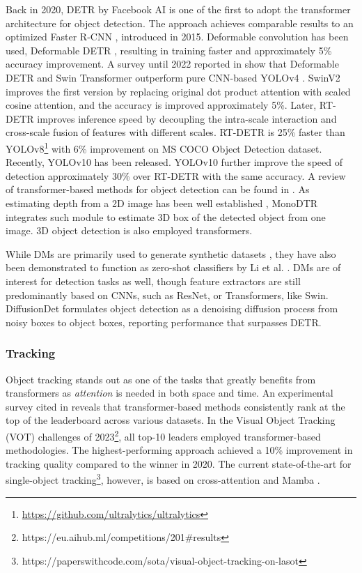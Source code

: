 \documentclass[11pt,a4paper]{article}
\begin{document}
Back in 2020, DETR by Facebook AI \cite{Carion:DERT:2020} is one of the first to adopt the transformer architecture for object detection. The approach achieves comparable results to an optimized Faster R-CNN \cite{Ren:Faster:2027}, introduced in 2015. Deformable convolution has been used, Deformable DETR \cite {Zhu:Deformable:2021}, resulting in training faster and approximately 5\% accuracy improvement.
A survey until 2022 reported in \cite{Zou:object:2023} show that Deformable DETR and Swin Transformer \cite{Liu:Swin:2021} outperform pure CNN-based YOLOv4 \cite{bochkovskiy2020yolov4}. 
SwinV2 improves the first version by replacing original dot product attention with scaled cosine attention, and the accuracy is improved approximately 5\%. Later, RT-DETR \cite{lv2:detrs:2024} improves inference speed by decoupling the intra-scale interaction and cross-scale fusion of features with different scales. RT-DETR is 25\% faster than YOLOv8\footnote{\url{https://github.com/ultralytics/ultralytics}} with 6\% improvement on MS COCO Object Detection dataset. Recently, YOLOv10 \cite{wang:yolov10:2024} has been released. YOLOv10 further improve the speed of detection approximately 30\% over RT-DETR with the same accuracy. A review of transformer-based methods for object detection can be found in \cite{Li:Transformer:2023}.
As estimating depth from a 2D image has been well established \cite{Yang:depthanything:2024}, MonoDTR \cite{Huang:MonoDTR:2022} integrates such module to estimate 3D box of the detected object from one image. 3D object detection is also employed transformers.

While DMs are primarily used to generate synthetic datasets \cite{Wu:datasetDM:2023, Fang:Data:2024}, they have also been demonstrated to function as zero-shot classifiers by Li et al. \cite{Li:Your:2023}. DMs are of interest for detection tasks as well, though feature extractors are still predominantly based on CNNs, such as ResNet, or Transformers, like Swin. DiffusionDet \cite{Chen:DiffusionDet:2023} formulates object detection as a denoising diffusion process from noisy boxes to object boxes, reporting performance that surpasses DETR.


\subsubsection{Tracking}
\label{sssec:tracking}

Object tracking stands out as one of the tasks that greatly benefits from transformers as \textit{attention} is needed in both space and time. An experimental survey cited in \cite{Kugarajeevan:Transformers:2023} reveals that transformer-based methods consistently rank at the top of the leaderboard across various datasets. In the Visual Object Tracking (VOT) challenges of 2023\footnote{https://eu.aihub.ml/competitions/201\#results}, all top-10 leaders employed transformer-based methodologies. The highest-performing approach achieved a 10\% improvement in tracking quality compared to the winner in 2020. The current state-of-the-art for single-object tracking\footnote{https://paperswithcode.com/sota/visual-object-tracking-on-lasot}, however, is based on cross-attention and Mamba \cite{kang2025exploring}.
\end{document}
